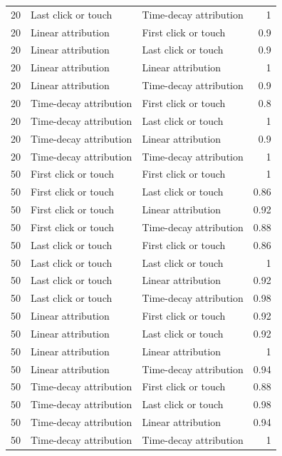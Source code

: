 \begin{table}
\begin{tabular}{rllr}
20 & Last click or touch & Time-decay attribution & 1 \\
20 & Linear attribution & First click or touch & 0.9 \\
20 & Linear attribution & Last click or touch & 0.9 \\
20 & Linear attribution & Linear attribution & 1 \\
20 & Linear attribution & Time-decay attribution & 0.9 \\
20 & Time-decay attribution & First click or touch & 0.8 \\
20 & Time-decay attribution & Last click or touch & 1 \\
20 & Time-decay attribution & Linear attribution & 0.9 \\
20 & Time-decay attribution & Time-decay attribution & 1 \\
50 & First click or touch & First click or touch & 1 \\
50 & First click or touch & Last click or touch & 0.86 \\
50 & First click or touch & Linear attribution & 0.92 \\
50 & First click or touch & Time-decay attribution & 0.88 \\
50 & Last click or touch & First click or touch & 0.86 \\
50 & Last click or touch & Last click or touch & 1 \\
50 & Last click or touch & Linear attribution & 0.92 \\
50 & Last click or touch & Time-decay attribution & 0.98 \\
50 & Linear attribution & First click or touch & 0.92 \\
50 & Linear attribution & Last click or touch & 0.92 \\
50 & Linear attribution & Linear attribution & 1 \\
50 & Linear attribution & Time-decay attribution & 0.94 \\
50 & Time-decay attribution & First click or touch & 0.88 \\
50 & Time-decay attribution & Last click or touch & 0.98 \\
50 & Time-decay attribution & Linear attribution & 0.94 \\
50 & Time-decay attribution & Time-decay attribution & 1 \\
\bottomrule
\end{tabular}
\end{table}
